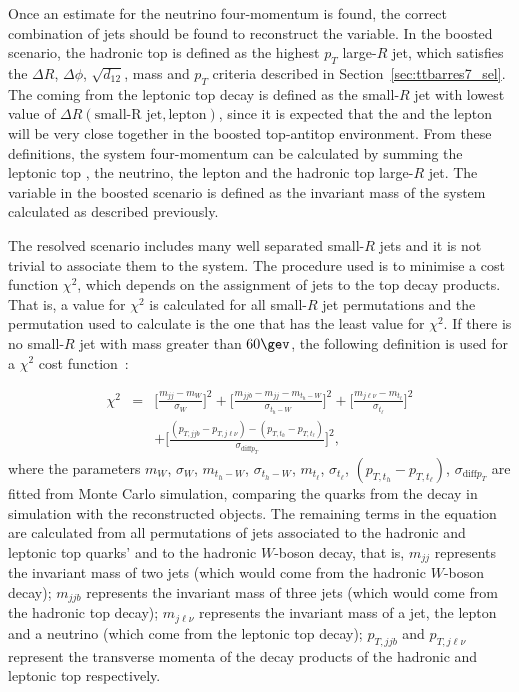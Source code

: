 Once an estimate for the neutrino four-momentum is found, the correct combination of jets should be found to reconstruct the \mtt variable. In the boosted scenario,
the hadronic top is defined as the highest $p_T$ large-$R$ jet, which satisfies the $\Delta R$, $\Delta \phi$, $\sqrt{d_{12}}$, mass and $p_T$ criteria described in
Section~\ref{sec:ttbarres7_sel}. The \bjet coming from the leptonic top decay is defined as the small-$R$ jet with lowest value of
$\Delta R(\textrm{small-R jet}, \textrm{lepton})$, since it is expected that the \bjet and the lepton will be very close together in the boosted
top-antitop environment.
From these definitions, the \ttbar system four-momentum can be calculated by summing the leptonic top \bjet, the neutrino, the lepton and the hadronic top large-$R$ jet.
The \mtt variable in the boosted scenario is defined as the invariant mass of the \ttbar system calculated as described previously.

The resolved scenario includes many well separated small-$R$ jets and it is not trivial to associate them to the \ttbar system. The procedure used is to minimise a
cost function $\chi^2$, which depends on the assignment of jets to the top decay products.
That is, a value for $\chi^2$ is calculated for all small-$R$ jet
permutations and the permutation used to calculate \mtt is the one
that has the least value for $\chi^2$.
If there is no small-$R$ jet with mass greater than $60\gev$, the following definition is used for a $\chi^2$ cost function~\cite{ttres7paper,ttres7note}:

\begin{eqnarray}
\displaystyle
\chi^2&=&\Big[\frac{m_{jj} - m_W}{\sigma_W}\Big]^2 + \Big[\frac{m_{jjb} - m_{jj} - m_{t_h-W}}{\sigma_{t_h-W}}\Big]^2 + \Big[\frac{m_{j\ell\nu} - m_{t_\ell}}{\sigma_{t_\ell}}\Big]^2 \nonumber \\
&&+ \Big[\frac{(p_{T,jjb} - p_{T,j\ell\nu}) - (p_{T,t_h} - p_{T,t_\ell})}{\sigma_{\textrm{diff} p_T}}\Big]^2,
\label{eq:mtt_resolved}
\end{eqnarray}
where the parameters $m_W$, $\sigma_W$, $m_{t_h-W}$, $\sigma_{t_h-W}$, $m_{t_\ell}$, $\sigma_{t_\ell}$, $(p_{T,t_h} - p_{T,t_\ell})$, $\sigma_{\textrm{diff} p_T}$ are fitted
from \ttbar Monte Carlo simulation, comparing the quarks from the \ttbar decay in simulation with the reconstructed objects. The remaining terms in the equation are calculated
from all permutations of jets associated to the hadronic and leptonic top quarks' \bjets and to the hadronic $W$-boson decay, that is, $m_{jj}$ represents the invariant mass
of two jets (which would come from the hadronic $W$-boson decay); $m_{jjb}$ represents the invariant mass of three jets (which would come from the hadronic top decay);
$m_{j\ell\nu}$ represents the invariant mass of a jet, the lepton and a neutrino (which come from the leptonic top decay); $p_{T,jjb}$ and $p_{T,j\ell\nu}$ represent the
transverse momenta of the decay products of the hadronic and leptonic top respectively.

